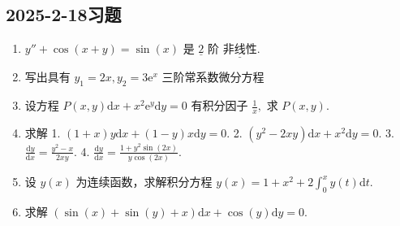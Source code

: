 \subsection{2025-2-18习题}

\begin{enumerate}
    \item $y''+\cos(x+y)=\sin(x)$ 是 $\underline{2}$ 阶 $\underline{非线性}$.
    \item 写出具有 $y_{1}=2x,y_{2}=3\mathrm{e}^{x}$ 三阶常系数微分方程
    \item 设方程 $P(x,y)\mathrm{d}x+x^{2}\mathrm{e}^{y}\mathrm{d}y=0$ 有积分因子 $\frac{1}{x},$ 求 $P(x,y).$
    \item 求解
    1. $(1+x)y\mathrm{d}x+(1-y)x\mathrm{d}y=0.$
    2. $(y^{2}-2xy)\mathrm{d}x+x^{2}\mathrm{d}y=0.$
    3. $\frac{\mathrm{d}y}{\mathrm{d}x}=\frac{y^{2}-x}{2xy}.$
    4. $\frac{\mathrm{d}y}{\mathrm{d}x}=\frac{1+y^{2}\sin(2x)}{y\cos(2x)}.$
    \item 设 $y(x)$ 为连续函数，求解积分方程 $y(x)=1+x^{2}+2\int^{x}_{0}y(t)\mathrm{d}t.$
    \item 求解 $(\sin(x)+\sin(y)+x)\mathrm{d}x+\cos(y)\mathrm{d}y=0.$
\end{enumerate}
